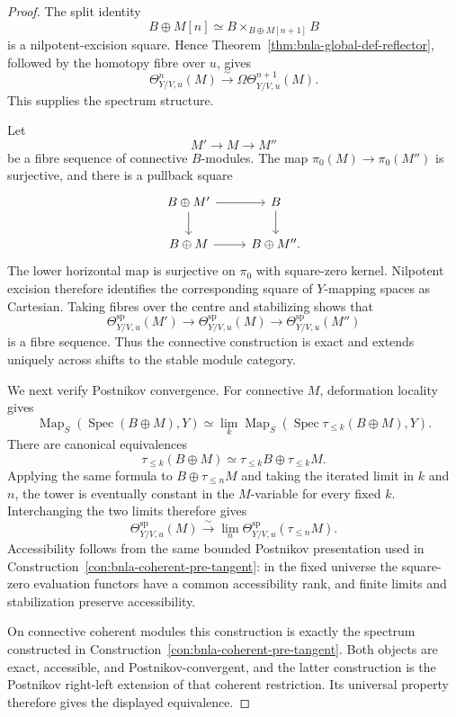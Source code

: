 \begin{proof}
The split identity
\[
    B\oplus M[n]
    \simeq
    B\times_{B\oplus M[n+1]}B
\]
is a nilpotent-excision square.  Hence
Theorem~\ref{thm:bnla-global-def-reflector}, followed by the homotopy fibre
over $u$, gives
\[
    \Theta^n_{Y/V,u}(M)
    \xrightarrow{\sim}
    \Omega\Theta^{n+1}_{Y/V,u}(M).
\]
This supplies the spectrum structure.

Let
\[
    M'\longrightarrow M\longrightarrow M''
\]
be a fibre sequence of connective $B$-modules.  The map
$\pi_0(M)\to\pi_0(M'')$ is surjective, and there is a pullback square
\[
\begin{tikzcd}
B\oplus M' \arrow[r] \arrow[d] &
B \arrow[d]\\
B\oplus M \arrow[r] &
B\oplus M''.
\end{tikzcd}
\]
The lower horizontal map is surjective on $\pi_0$ with square-zero kernel.
Nilpotent excision therefore identifies the corresponding square of
$Y$-mapping spaces as Cartesian.  Taking fibres over the centre and
stabilizing shows that
\[
    \Theta^{\mathrm{sp}}_{Y/V,u}(M')
    \longrightarrow
    \Theta^{\mathrm{sp}}_{Y/V,u}(M)
    \longrightarrow
    \Theta^{\mathrm{sp}}_{Y/V,u}(M'')
\]
is a fibre sequence.  Thus the connective construction is exact and extends
uniquely across shifts to the stable module category.

We next verify Postnikov convergence.  For connective $M$, deformation
locality gives
\[
\operatorname{Map}_S(\operatorname{Spec}(B\oplus M),Y)
\simeq
\lim_k
\operatorname{Map}_S
\left(
    \operatorname{Spec}\tau_{\leq k}(B\oplus M),Y
\right).
\]
There are canonical equivalences
\[
    \tau_{\leq k}(B\oplus M)
    \simeq
    \tau_{\leq k}B\oplus\tau_{\leq k}M.
\]
Applying the same formula to $B\oplus\tau_{\leq n}M$ and taking the iterated
limit in $k$ and $n$, the tower is eventually constant in the $M$-variable
for every fixed $k$.  Interchanging the two limits therefore gives
\[
    \Theta^{\mathrm{sp}}_{Y/V,u}(M)
    \xrightarrow{\sim}
    \lim_n
    \Theta^{\mathrm{sp}}_{Y/V,u}(\tau_{\leq n}M).
\]
Accessibility follows from the same bounded Postnikov presentation used in
Construction~\ref{con:bnla-coherent-pre-tangent}: in the fixed universe the
square-zero evaluation functors have a common accessibility rank, and finite
limits and stabilization preserve accessibility.

On connective coherent modules this construction is exactly the spectrum
constructed in
Construction~\ref{con:bnla-coherent-pre-tangent}.  Both objects are exact,
accessible, and Postnikov-convergent, and the latter construction is the
Postnikov right-left extension of that coherent restriction.  Its universal
property therefore gives the displayed equivalence.
\end{proof}


